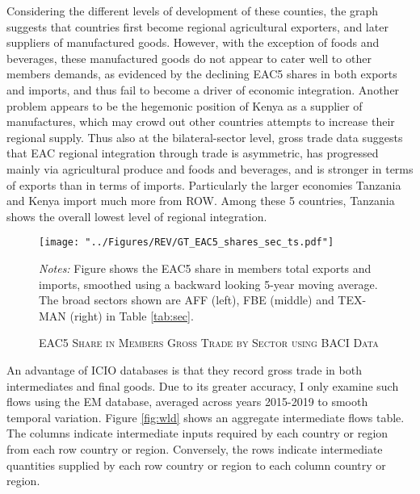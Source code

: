 \documentclass[a4paper]{article}
\begin{document}
Considering the different levels of development of these counties, the graph suggests that countries first become regional agricultural exporters, and later suppliers of manufactured goods. However, with the exception of foods and beverages, these manufactured goods do not appear to cater well to other members demands, as evidenced by the declining EAC5 shares in both exports and imports, and thus fail to become a driver of economic integration. Another problem appears to be the hegemonic position of Kenya as a supplier of manufactures, which may crowd out other countries attempts to increase their regional supply. Thus also at the bilateral-sector level, gross trade data suggests that EAC regional integration through trade is asymmetric, has progressed mainly via agricultural produce and foods and beverages, and is stronger in terms of exports than in terms of imports. %
Particularly the larger economies Tanzania and Kenya import much more from ROW. Among these 5 countries, Tanzania shows the overall lowest level of regional integration. 

\begin{figure}[h!] \vspace{-3mm}
\centering
\caption{\label{fig:GTEACsharesSec}\textsc{EAC5 Share in Members Gross Trade by Sector using BACI Data}}
\texttt{[image: "../Figures/REV/GT\_EAC5\_shares\_sec\_ts.pdf"]} %
\raggedright
\scriptsize 
\emph{Notes:} Figure shows the EAC5 share in members total exports and imports, smoothed using a backward looking 5-year moving average. The broad sectors shown are AFF (left), FBE (middle) and TEX-MAN (right) in Table \ref{tab:sec}.
\end{figure}
\FloatBarrier

An advantage of ICIO databases is that they record gross trade in both intermediates and final goods. Due to its greater accuracy, I only examine such flows using the EM database, averaged across years 2015-2019 to smooth temporal variation. Figure \ref{fig:wld} shows an aggregate intermediate flows table. The columns indicate intermediate inputs required by each country or region from each row country or region. Conversely, the rows indicate intermediate quantities supplied by each row country or region to each column country or region. \newline %
\end{document}
